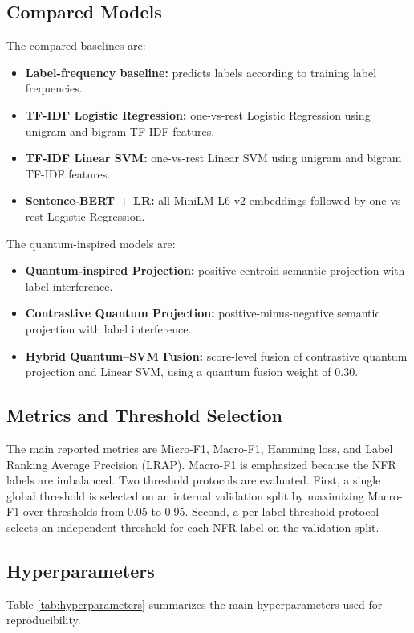 \documentclass[runningheads]{llncs}
\begin{document}
\subsection{Compared Models}
The compared baselines are:
\begin{itemize}
    \item \textbf{Label-frequency baseline:} predicts labels according to training label frequencies.
    \item \textbf{TF-IDF Logistic Regression:} one-vs-rest Logistic Regression using unigram and bigram TF-IDF features.
    \item \textbf{TF-IDF Linear SVM:} one-vs-rest Linear SVM using unigram and bigram TF-IDF features.
    \item \textbf{Sentence-BERT + LR:} all-MiniLM-L6-v2 embeddings followed by one-vs-rest Logistic Regression.
\end{itemize}

The quantum-inspired models are:
\begin{itemize}
    \item \textbf{Quantum-inspired Projection:} positive-centroid semantic projection with label interference.
    \item \textbf{Contrastive Quantum Projection:} positive-minus-negative semantic projection with label interference.
    \item \textbf{Hybrid Quantum--SVM Fusion:} score-level fusion of contrastive quantum projection and Linear SVM, using a quantum fusion weight of 0.30.
\end{itemize}

\subsection{Metrics and Threshold Selection}
The main reported metrics are Micro-F1, Macro-F1, Hamming loss, and Label
Ranking Average Precision (LRAP). Macro-F1 is emphasized because the NFR labels
are imbalanced. Two threshold protocols are evaluated. First, a single global
threshold is selected on an internal validation split by maximizing Macro-F1
over thresholds from 0.05 to 0.95. Second, a per-label threshold protocol
selects an independent threshold for each NFR label on the validation split.

\subsection{Hyperparameters}
Table \ref{tab:hyperparameters} summarizes the main hyperparameters used for
reproducibility.
\end{document}
